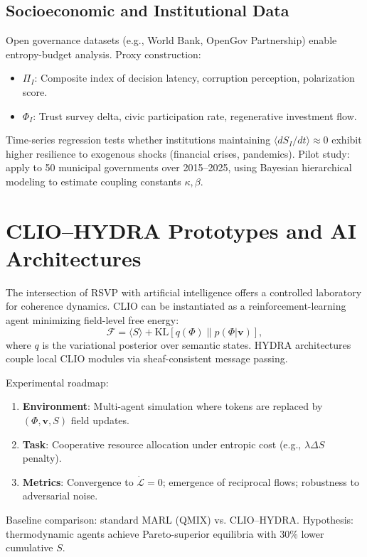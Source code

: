 \documentclass[12pt,a4paper]{article}
\begin{document}
\subsection{Socioeconomic and Institutional Data}
Open governance datasets (e.g., World Bank, OpenGov Partnership) enable entropy-budget analysis. Proxy construction:
\begin{itemize}
\item $\Pi_I$: Composite index of decision latency, corruption perception, polarization score.
\item $\Phi_I$: Trust survey delta, civic participation rate, regenerative investment flow.
\end{itemize}
Time-series regression tests whether institutions maintaining $\langle dS_I/dt \rangle \approx 0$ exhibit higher resilience to exogenous shocks (financial crises, pandemics). Pilot study: apply to 50 municipal governments over 2015--2025, using Bayesian hierarchical modeling to estimate coupling constants $\kappa, \beta$.

\section{CLIO--HYDRA Prototypes and AI Architectures}
The intersection of RSVP with artificial intelligence offers a controlled laboratory for coherence dynamics. CLIO can be instantiated as a reinforcement-learning agent minimizing field-level free energy:
\begin{equation}
\mathcal{F} = \langle S \rangle + \text{KL}[q(\Phi) \| p(\Phi|\bm{v})],
\label{eq:clio-free-energy}
\end{equation}
where $q$ is the variational posterior over semantic states. HYDRA architectures couple local CLIO modules via sheaf-consistent message passing.

Experimental roadmap:
\begin{enumerate}
\item \textbf{Environment}: Multi-agent simulation where tokens are replaced by $(\Phi, \bm{v}, S)$ field updates.
\item \textbf{Task}: Cooperative resource allocation under entropic cost (e.g., $\lambda \Delta S$ penalty).
\item \textbf{Metrics}: Convergence to $\dot{\mathcal{L}} = 0$; emergence of reciprocal flows; robustness to adversarial noise.
\end{enumerate}
Baseline comparison: standard MARL (QMIX) vs. CLIO--HYDRA. Hypothesis: thermodynamic agents achieve Pareto-superior equilibria with 30\% lower cumulative $S$.
\end{document}
